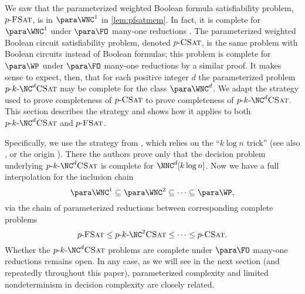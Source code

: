 %
%
%
We saw that the parameterized weighted Boolean formula satisfiability problem, $p \textnormal{-} \textsc{FSat}$, is in $\para \WNC^1$ in \autoref{lem:pfsatmem}.
In fact, it is complete for $\para \WNC^1$ under $\para \FO$ many-one reductions \autocite[Theorem~3.6]{est15}.
The parameterized weighted Boolean circuit satisfiability problem, denoted $p \textnormal{-} \textsc{CSat}$, is the same problem with Boolean circuits instead of Boolean formulas; this problem is complete for $\para \WP$ under $\para \FO$ many-one reductions by a similar proof.
%
%
%
It makes sense to expect, then, that for each positive integer $d$ the parameterized problem $\pNCSAT$ may be complete for the class $\para \WNC^d$.
%
%
%
We adapt the strategy used to prove completeness of $p \textnormal{-} \textsc{CSat}$ to prove completeness of $\pNCSAT$.
%
%
%
This section describes the strategy and shows how it applies to both $\pNCSAT$ and $p \textnormal{-} \textsc{FSat}$.

%
%
%
%
Specifically, we use the strategy from \autocite[Theorem~3.6]{cc97lim}, which relies on the ``$k \log n$ trick'' (see also \autocite[Corollary~3.13]{fg06}, or the origin \autocite{adf95}).
There the authors prove only that the decision problem underlying $\pNCSAT$ is complete for $\NNC^d[k \log n]$.
%
%
%
Now we have a full interpolation for the inclusion chain
\[
\para \WNC^1 \subseteq \para \WNC^2 \subseteq \dotsb \subseteq \para \WP,
\]
via the chain of parameterized reductions between corresponding complete problems
\[
\pFSAT \leq p \dash k \dash \NC^2 \textsc{CSat} \leq \dotsb \leq p \dash \textsc{CSat}.
\]
Whether the $\pNCSAT$ problems are complete under $\para \FO$ many-one reductions remains open.
%
%
In any case, as we will see in the next section (and repeatedly throughout this paper), parameterized complexity and limited nondeterminism in decision complexity are closely related.

